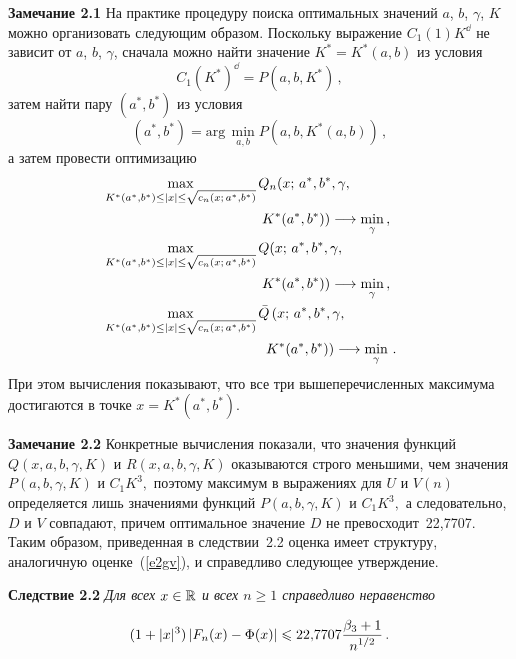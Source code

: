 \begin{multicols}{2}
\noindent
\textbf{Замечание 2.1} На практике процедуру поиска оптимальных
значений $a$, $b$, $\gamma$, $K$ можно организовать следующим
образом. Поскольку выражение $C_1(1)K^{\dd}$ не зависит от $a$,
$b$, $\gamma$, сначала можно найти значение $K^*=K^*(a,b)$ из
условия
$$
C_1(K^*)^{\dd}=P(a,b,K^*)\,,
$$
затем найти пару $(a^*,b^*)$ из условия
$$
(a^*,b^*)=\mathrm{arg}\,\min_{a,b}P\left(a,b,K^*(a,b)\right)\,,
$$
а затем провести оптимизацию
\begin{align*}
&\hspace*{-5mm}\max_{
K^*(a^*,b^*)\le|x|\le\sqrt{c_n(x;\,a^*,b^*)}}Q_n(x;\,a^*,b^*,\gamma,\\
&\hspace*{35mm}K^*(a^*,b^*)) \longrightarrow\min_{\gamma}\,,
\\
&\hspace*{-5mm}\max_{
K^*(a^*,b^*)\le|x|\le\sqrt{c_n(x;\,a^*,b^*)}}Q(x;\,a^*,b^*,\gamma, \\
&\hspace*{35mm}K^*(a^*,b^*)) \longrightarrow\min_{\gamma}\,,
\\
&\hspace*{-5mm}\max_{
K^*(a^*,b^*)\le|x|\le\sqrt{c_n(x;\,a^*,b^*)}}\bar{Q}\left(x;\,a^*,b^*,\gamma,\right.\\
&\hspace*{35mm}\left.K^*(a^*,b^*)\right) \longrightarrow\min_{\gamma}\,.
\end{align*}
При этом вычисления показывают, что все три вышеперечисленных
максимума достигаются в точке $x = K^*(a^*,b^*).$

\smallskip

\noindent
\textbf{Замечание 2.2} Конкретные вычисления показали, что
значения функций $Q(x,a,b,\gamma,K)$ и $R(x,a,b,\gamma,K)$
оказываются строго меньшими, чем значения
$P(a,b,\gamma,K)$ и $C_1K^3,$ поэтому максимум в выражениях для
$U$ и $V(n)$ определяется лишь значениями функций
$P(a,b,\gamma,K)$ и $C_1K^3,$ а следовательно, $D$ и $V$
совпадают, причем оптимальное значение $D$ не превосходит~22,7707.
Таким образом, приведенная в следствии~2.2 оценка имеет структуру,
аналогичную оценке~(\ref{e2gv}), и справедливо следующее
утверждение.

\smallskip

\noindent
\textbf{Следствие 2.2} \textit{Для всех $x\in\mathbb R$ и всех $n\ge1$
справедливо неравенство}

\noindent
$$
(1+|x|^3)\left|F_n(x)-\Phi(x)\right|\leqslant
22{,}7707\displaystyle\frac{\displaystyle \beta_3+1\mathstrut}{\displaystyle n^{1/2}\mathstrut}\,.
$$


\end{multicols}

